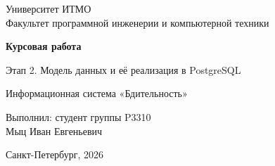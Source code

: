 \documentclass[12pt,a4paper]{article}
\begin{document}
\begin{titlepage}
\centering
Университет ИТМО\\
Факультет программной инженерии и компьютерной техники

\vspace{60mm}
{\Large\bfseries Курсовая работа\par}
\vspace{4mm}
{\large Этап 2. Модель данных и её реализация в PostgreSQL\par}
\vspace{8mm}
{\large Информационная система «Бдительность»\par}

\vfill
\begin{flushright}
Выполнил: студент группы P3310\\
Мыц Иван Евгеньевич
\end{flushright}
\vspace{20mm}
Санкт-Петербург, 2026
\end{titlepage}
\end{document}

